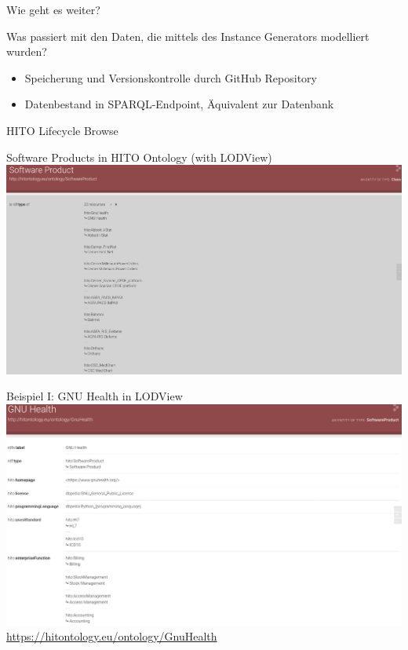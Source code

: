\documentclass[aspectratio=1610,12pt]{beamer}
\begin{document}
\begin{frame}{Wie geht es weiter?}
  \begin{spacing}{1.5}
    Was passiert mit den Daten, die mittels des Instance Generators modelliert wurden?
  \begin{itemize}
    \item Speicherung und Versionskontrolle durch GitHub Repository
    \item Datenbestand in SPARQL-Endpoint, Äquivalent zur Datenbank
  \end{itemize}
\end{spacing}
\end{frame}

\begin{frame}{HITO Lifecycle Browse}
  \centering
  \vspace{-0.5cm}
\end{frame}

\begin{frame}{Software Products in HITO Ontology (with LODView)}
\centering
\includegraphics[width=\textwidth]{img/softwareproduct.png}
\end{frame}

\begin{frame}{Beispiel I: GNU Health in LODView}
\vspace{-0.3cm}
\centering
\includegraphics[width=.95\textwidth]{img/GnuHealth.png}
\footnotesize{\url{https://hitontology.eu/ontology/GnuHealth}}
\end{frame}
\end{document}
